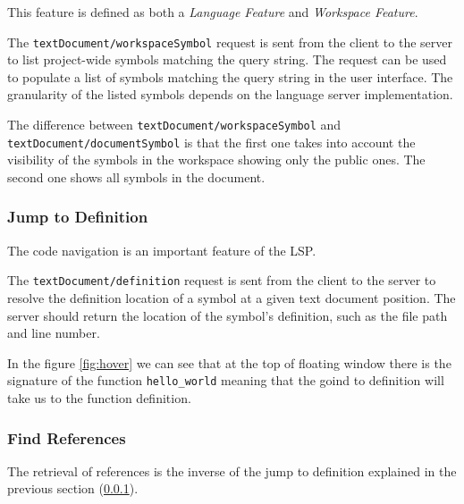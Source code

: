 \noindent
This feature is defined as both a \textit{Language Feature} and \textit{Workspace Feature}.

The \texttt{textDocument/workspaceSymbol} request is sent from the client to the server to list project-wide symbols matching the query string. The request can be used to populate a list of symbols matching the query string in the user interface. The granularity of the listed symbols depends on the language server implementation.

The difference between \texttt{textDocument/workspaceSymbol} and \texttt{textDocument/documentSymbol} is that the first one takes into account the visibility of the symbols in the workspace showing only the public ones. The second one shows all symbols in the document.


\subsubsection{Jump to Definition}\label{subsubsec:background:JumpToDefinition}
\hfill \break

The code navigation is an important feature of the LSP.

The \texttt{textDocument/definition} request is sent from the client to the server to resolve the definition location of a symbol at a given text document position. The server should return the location of the symbol's definition, such as the file path and line number.

In the figure \ref{fig:hover} we can see that at the top of floating window there is the signature of the function \texttt{hello\_world} meaning that the goind to definition will take us to the function definition.

\subsubsection{Find References}
\hfill \break

The retrieval of references is the inverse of the jump to definition explained in the previous section (\ref{subsubsec:background:JumpToDefinition}).

